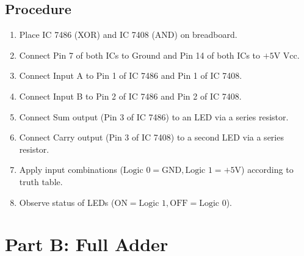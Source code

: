 \subsection{Procedure}
\begin{enumerate}
    \item Place IC 7486 (XOR) and IC 7408 (AND) on breadboard.
    \item Connect Pin 7 of both ICs to Ground and Pin 14 of both ICs to $+5\text{V Vcc}$.
    \item Connect Input A to Pin 1 of IC 7486 and Pin 1 of IC 7408.
    \item Connect Input B to Pin 2 of IC 7486 and Pin 2 of IC 7408.
    \item Connect Sum output (Pin 3 of IC 7486) to an LED via a series resistor.
    \item Connect Carry output (Pin 3 of IC 7408) to a second LED via a series resistor.
    \item Apply input combinations ($\text{Logic } 0 = \text{GND}, \text{Logic } 1 = +5\text{V}$) according to truth table.
    \item Observe status of LEDs ($\text{ON} = \text{Logic } 1, \text{OFF} = \text{Logic } 0$).
\end{enumerate}

\section{Part B: Full Adder}

